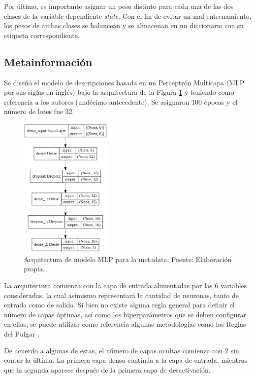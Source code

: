 Por último, es importante asignar un peso distinto para cada una de las dos clases de la variable dependiente \textit{state}. Con el fin de evitar un mal entrenamiento, los pesos de ambas clases se balancean y se almacenan en un diccionario con su etiqueta correspondiente.

\subsection{Metainformación}
Se diseñó el modelo de descripciones basada en un Perceptrón Multicapa (MLP por sus siglas en inglés) bajo la arquitectura de la Figura \ref{4:fig35} y teniendo como referencia a los autores \citeauthor{pr_yu2018deeplearning} (undécimo antecedente). Se asignaron 100 épocas y el número de lotes fue 32.

\begin{figure}[!ht]
	\begin{center}
		\includegraphics[width=0.40\textwidth]{4/figures/model_mlp_metadata.png}
		\caption{Arquitectura de modelo MLP para la metadata. Fuente: Elaboración propia.}
		\label{4:fig35}
	\end{center}
\end{figure}

La arquitectura comienza con la capa de entrada alimentadas por las 6 variables consideradas, la cual asimismo representará la cantidad de neuronas, tanto de entrada como de salida.
Si bien no existe alguna regla general para definir el número de capas óptimas, así como los hiperparámetros que se deben configurar en ellas, se puede utilizar como referencia algunas metodologías como las Reglas del Pulgar \parencite{tec_ranjan2019thumbrules}.

De acuerdo a algunas de estas, el número de capas ocultas comienza con 2 sin contar la última. La primera capa densa continúa a la capa de entrada, mientras que la segunda aparece después de la primera capa de desactivación.

